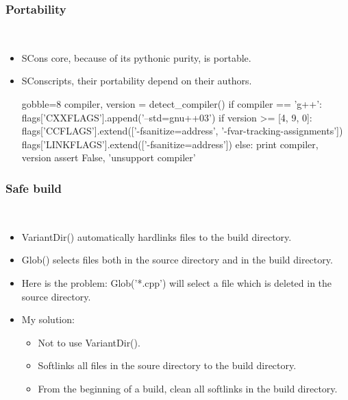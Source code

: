 \documentclass[lualatex]{beamer}
\begin{document}
\begin{frame}[fragile]
  \frametitle{Portability}

  \begin{block}{~}
    \begin{itemize}
    \item SCons core, because of its pythonic purity, is portable.
    \item SConscripts, their portability depend on their authors.
      \begin{py*}{gobble=8}
        compiler, version = detect_compiler()
        if compiler == 'g++':
          flags['CXXFLAGS'].append('--std=gnu++03')
          if version >= [4, 9, 0]:
            flags['CCFLAGS'].extend(['-fsanitize=address', '-fvar-tracking-assignments'])
            flags['LINKFLAGS'].extend(['-fsanitize=address'])
        else:
          print compiler, version
          assert False, 'unsupport compiler'
      \end{py*}
    \end{itemize}
  \end{block}
\end{frame}

\begin{frame}
  \frametitle{Safe build}

  \begin{block}{~}
    \begin{itemize}
    \item VariantDir() automatically hardlinks files to the build directory.
    \item Glob() selects files both in the source directory and in the build directory.
    \item<2-> Here is the problem: Glob('*.cpp') will select a file which is deleted in the source directory.
    \item<2-> My solution:
      \begin{itemize}
      \item Not to use VariantDir().
      \item Softlinks all files in the soure directory to the build directory.
      \item From the beginning of a build, clean all softlinks in the build directory.
      \end{itemize}
    \end{itemize}
  \end{block}
\end{frame}
\end{document}
